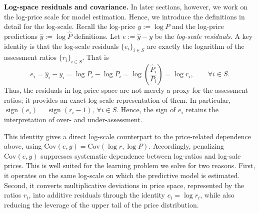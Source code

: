 \documentclass[12pt, draft]{article}
\theoremstyle{plain}
\theoremstyle{definition}
\newcommand{\E}{\mathbb{E}}
\newcommand{\1}{\mathbf{1}}
\newcommand{\Cov}{\text{Cov}}
\newcommand{\Var}{\text{Var}}
\begin{document}
{\noindent \textbf{Log-space residuals and covariance.} In later sections, however, we work on the log-price scale for model estimation. Hence, we introduce the definitions in detail for the log-scale. Recall the log-price
$
y:=\log P$ and the log-price predictions $\hat y:=\log \widehat P$ definitions. Let $e:=\hat y-y$ be the \textit{log-scale residuals}. 
A key identity is that the log-scale residuals $\{e_i\}_{i\in S}$ are exactly the logarithm of the assessment ratios $\{r_i\}_{i \in S}$. That is \vspace{-2mm}
\begin{equation}
\label{eq:log_ratio_identity}
e_i
=
\hat y_i-y_i
=
\log \widehat P_i-\log P_i
=
\log\!\left(\frac{\widehat P_i}{P_i}\right)
=
\log r_i,
\qquad \forall i\in S.
\end{equation}
Thus, the residuals in log-price space are not merely a proxy for the assessment ratios; it provides an exact log-scale representation of them. In particular,
$
\operatorname{sign}(e_i)=\operatorname{sign}(r_i-1), \, \forall i\in S.
$
Hence, the sign of $e_i$ retains the interpretation of over- and under-assessment. 

This identity gives a direct log-scale counterpart to the price-related dependence above, using 
$
\Cov(e,y)=\Cov(\log r,\log P).
$
Accordingly, penalizing $\Cov(e,y)$ suppresses systematic dependence between log-ratios and log-sale prices. This is well suited for the learning problem we solve for two reasons. First, it operates on the same log-scale on which the predictive model is estimated. Second, it converts multiplicative deviations in price space, represented by the ratios $r_i$, into additive residuals through the identity $e_i=\log r_i$, while also reducing the leverage of the upper tail of the price distribution.



}
\end{document}

